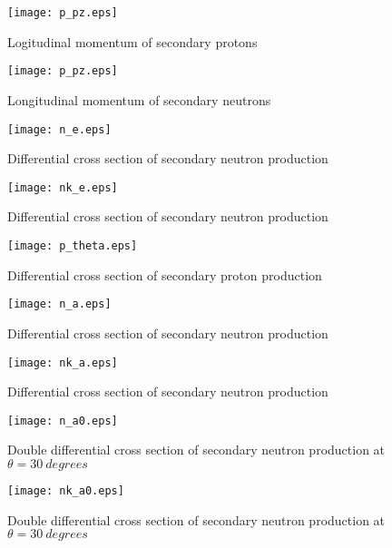 \documentclass[12pt]{article}
\begin{document}
\newpage

\begin{figure}[htbp]
\caption{Logitudinal momentum of secondary protons}
\label{fig5}  
\centerline{\texttt{[image: p\_pz.eps]}}
\end{figure}
\begin{figure}[htbp]
\caption{Longitudinal momentum of secondary neutrons}
\label{fig6} 
\centerline{\texttt{[image: p\_pz.eps]}}
\end{figure}

\newpage

\begin{figure}[htbp]
\caption{Differential cross section of secondary neutron production}
\label{fig7}  
\centerline{\texttt{[image: n\_e.eps]}}
\end{figure}
\begin{figure}[htbp]
\caption{Differential cross section of secondary neutron production}
\label{fig8}  
\centerline{\texttt{[image: nk\_e.eps]}}
\end{figure}
\begin{figure}[htbp]
\caption{Differential cross section of secondary proton production}
\label{fig9} 
\centerline{\texttt{[image: p\_theta.eps]}}
\end{figure}
\begin{figure}[htbp]
\caption{Differential cross section of secondary neutron production}
\label{fig10} 
\centerline{\texttt{[image: n\_a.eps]}}
\end{figure}
\begin{figure}[htbp]
\caption{Differential cross section of secondary neutron production}
\label{fig10a} 
\centerline{\texttt{[image: nk\_a.eps]}}
\end{figure}

\clearpage


\begin{figure}[htbp]
\caption{Double differential cross section of secondary neutron production at $\theta = 30~degrees$}
\label{figa0} 
\centerline{\texttt{[image: n\_a0.eps]}}
\end{figure}

\begin{figure}[htbp]
\caption{Double differential cross section of secondary neutron production at $\theta = 30~degrees$}
\label{figa0a} 
\centerline{\texttt{[image: nk\_a0.eps]}}
\end{figure}
\end{document}
